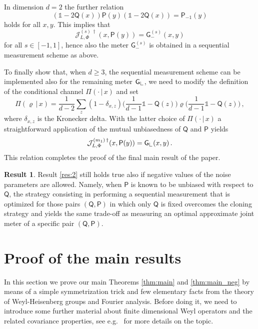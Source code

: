 \documentclass[12pt,reqno]{amsart}
\theoremstyle{definition}
\newcommand{\id}{\mathds{1}} %
\newcommand{\Qo}{\mathsf{Q}}%
\newcommand{\Po}{\mathsf{P}}%
\newcommand{\Go}{\mathsf{G}}%
\newcommand{\Lcorner}{{\mathchoice{\mathrel{\makebox[7pt][c]{\rule{.4pt}{7.5pt}\rule{5pt}{.4pt}}}}{\mathrel{\makebox[7pt][c]{\rule{.4pt}{7.5pt}\rule{5pt}{.4pt}}}}{\mathrel{\makebox[5.5pt][c]{\rule{.4pt}{5.25pt}\rule{3.5pt}{.4pt}}}}{\mathrel{\makebox[4pt][c]{\rule{.4pt}{3.75pt}\rule{2.5pt}{.4pt}}}}}}
\newtheorem{result}{Result}
\newcommand{\rhoo}{\varrho} %
\newcommand{\ii}{\mathcal{J}}
\begin{document}
In dimension $d=2$ the further relation
$$
(\id-2\Qo(x))\Po(y)(\id-2\Qo(x)) = \Po_{-1}(y)
$$
holds for all $x,y$. This implies that
\begin{equation} %
\ii_{L,\Phi}^{(s)\,\dag}(x,\Po(y)) = \Go^{(s)}_-(x,y)
\end{equation}
for all $s\in [-1,1]$, hence also the meter $\Go^{(s)}_-$ is obtained in a sequential measurement scheme as above.

To finally show that, when $d\geq 3$, the sequential measurement scheme can be implemented also for the remaining meter $\Go_\Lcorner$, we need to modify the definition of the conditional channel $\Pi(\cdot\,|\,x)$ and set
\begin{equation} %
\Pi(\rhoo\,|\,x) = \frac{1}{d-2}\sum_z (1-\delta_{x,z}) \bigg(\frac{1}{d-1}\id - \Qo(z)\bigg)\rhoo\bigg(\frac{1}{d-1}\id - \Qo(z)\bigg) \,,
\end{equation}
where $\delta_{x,z}$ is the Kronecker delta. With the latter choice of $\Pi(\cdot\,|\,x)$ a straightforward application of the mutual unbiasedness of $\Qo$ and $\Po$ yields
\begin{equation} %
\ii_{L,\Phi}^{(m_1)\,\dag}(x,\Po(y)) = \Go_\Lcorner(x,y)\,.
\end{equation}
This relation completes the proof of the final main result of the paper.
\begin{result}
Result \ref{res:2} still holds true also if negative values of the noise parameters are allowed. Namely, when $\Po$ is known to be unbiased with respect to $\Qo$, the strategy consisting in performing a sequential measurement that is optimized for those pairs $(\Qo,\Po)$ in which only $\Qo$ is fixed overcomes the cloning strategy and yields the same trade-off as measuring an optimal approximate joint meter of a specific pair $(\Qo,\Po)$.
\end{result}


\section{Proof of the main results}\label{sec:proof}

In this section we prove our main Theorems \ref{thm:main} and \ref{thm:main_neg} by means of a simple symmetrization trick and few elementary facts from the theory of Weyl-Heisenberg groups and Fourier analysis. Before doing it, we need to introduce some further material about finite dimensional Weyl operators and the related covariance properties, see e.g.~\cite{AuTo79,BaIt86,StTo84,Va95,Te99} for more details on the topic.
\end{document}
